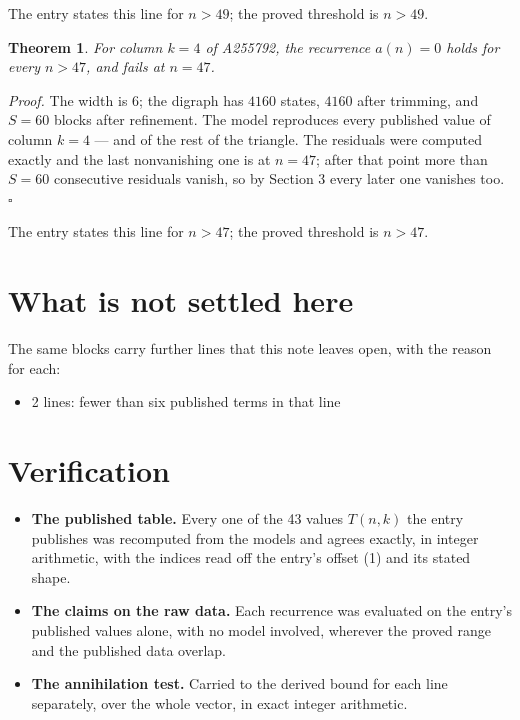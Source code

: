 \documentclass[11pt]{article}
\newtheorem{theorem}{Theorem}
\theoremstyle{definition}
\begin{document}
The entry states this line for $n > 49$; the proved threshold is $n > 49$.

\begin{theorem} For column $k = 4$ of A255792, the recurrence $a(n) = 0$ holds for every $n > 47$, and fails at $n = 47$.\end{theorem}

{\itshape Proof.} The width is $6$; the digraph has $4160$ states, $4160$ after trimming, and $S = 60$ blocks after refinement. The model reproduces every published value of column $k = 4$ --- and of the rest of the triangle. The residuals were computed exactly and the last nonvanishing one is at $n = 47$; after that point more than $S = 60$ consecutive residuals vanish, so by Section 3 every later one vanishes too. $\square$

The entry states this line for $n > 47$; the proved threshold is $n > 47$.

\section{What is not settled here}

The same blocks carry further lines that this note leaves open, with the reason for each:

\begin{itemize}

\item 2 lines: fewer than six published terms in that line

\end{itemize}

\section{Verification}

\begin{itemize}

\item {\bfseries The published table.} Every one of the 43 values $T(n,k)$ the entry publishes was recomputed from the models and agrees exactly, in integer arithmetic, with the indices read off the entry's offset (1) and its stated shape.

\item {\bfseries The claims on the raw data.} Each recurrence was evaluated on the entry's published values alone, with no model involved, wherever the proved range and the published data overlap.

\item {\bfseries The annihilation test.} Carried to the derived bound for each line separately, over the whole vector, in exact integer arithmetic.

\end{itemize}
\end{document}
